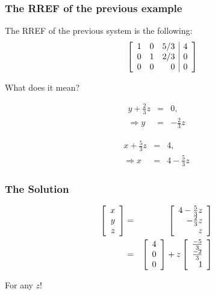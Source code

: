 \begin{frame}
  \frametitle{The RREF of the previous example}

  The RREF of the previous system is the following:
  \begin{eqnarray*}
    \stateThree{~}{~}{~}
    \startRowOps
    \oneRowOps{1}{0}{5/3}{4}
    \oneRowOps{0}{1}{2/3}{0}
    \oneRowOps{0}{0}{0}{0}
    \stopRowOps
  \end{eqnarray*}

  What does it mean?

  \begin{eqnarray*}
    y + \frac{2}{3}z & = & 0, \\
    \Rightarrow y & = & -\frac{2}{3} z
  \end{eqnarray*}

  {
    \begin{eqnarray*}
      x + \frac{5}{3} z & = & 4, \\
      \Rightarrow x & = & 4 - \frac{5}{3} z
    \end{eqnarray*}
  }

\end{frame}

\begin{frame}
  \frametitle{The Solution}

  \begin{eqnarray*}
    \left[ \begin{array}{r} x \\ y \\ z \end{array} \right] & = & \left[ \begin{array}{r} 4 - \frac{5}{3}z \\ -\frac{2}{3}z \\ z \end{array} \right] \\
    & = & \left[ \begin{array}{r} 4 \\ 0 \\ 0 \end{array} \right] + z \left[ \begin{array}{r} \frac{-5}{3} \\ \frac{-2}{3} \\ 1 \end{array} \right]
  \end{eqnarray*}

  For any $z$!

\end{frame}

